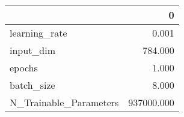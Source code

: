\begin{tabular}{lr}
\toprule
{} &           0 \\
\midrule
learning\_rate          &       0.001 \\
input\_dim              &     784.000 \\
epochs                 &       1.000 \\
batch\_size             &       8.000 \\
N\_Trainable\_Parameters &  937000.000 \\
\bottomrule
\end{tabular}
